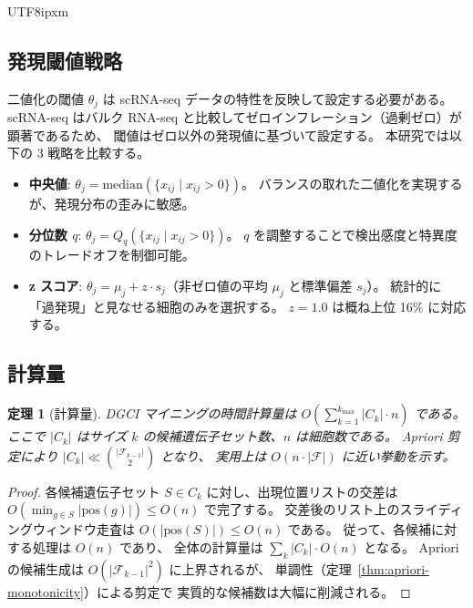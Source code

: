 \documentclass[11pt,a4paper]{article}
\newtheorem{theorem}{定理}
\begin{document}
\begin{CJK}{UTF8}{ipxm}
\subsection{発現閾値戦略}

二値化の閾値 $\theta_j$ は scRNA-seq データの特性を反映して設定する必要がある。
scRNA-seq はバルク RNA-seq と比較してゼロインフレーション（過剰ゼロ）が顕著であるため、
閾値はゼロ以外の発現値に基づいて設定する。
本研究では以下の 3 戦略を比較する。

\begin{itemize}
  \item \textbf{中央値}: $\theta_j = \mathrm{median}(\{x_{ij} \mid x_{ij} > 0\})$。
        バランスの取れた二値化を実現するが、発現分布の歪みに敏感。
  \item \textbf{分位数 $q$}: $\theta_j = Q_q(\{x_{ij} \mid x_{ij} > 0\})$。
        $q$ を調整することで検出感度と特異度のトレードオフを制御可能。
  \item \textbf{z スコア}: $\theta_j = \mu_j + z \cdot s_j$（非ゼロ値の平均 $\mu_j$ と標準偏差 $s_j$）。
        統計的に「過発現」と見なせる細胞のみを選択する。
        $z = 1.0$ は概ね上位 16\% に対応する。
\end{itemize}

\subsection{計算量}

\begin{theorem}[計算量]
\label{thm:complexity}
DGCI マイニングの時間計算量は $O\!\left(\sum_{k=1}^{k_{\max}} |C_k| \cdot n\right)$ である。
ここで $|C_k|$ はサイズ $k$ の候補遺伝子セット数、$n$ は細胞数である。
Apriori 剪定により $|C_k| \ll \binom{|\mathcal{F}_{k-1}|}{2}$ となり、
実用上は $O(n \cdot |\mathcal{F}|)$ に近い挙動を示す。
\end{theorem}

\begin{proof}
各候補遺伝子セット $S \in C_k$ に対し、出現位置リストの交差は
$O(\min_{g \in S} |\mathrm{pos}(g)|) \leq O(n)$ で完了する。
交差後のリスト上のスライディングウィンドウ走査は $O(|\mathrm{pos}(S)|) \leq O(n)$ である。
従って、各候補に対する処理は $O(n)$ であり、
全体の計算量は $\sum_{k} |C_k| \cdot O(n)$ となる。
Apriori の候補生成は $O(|\mathcal{F}_{k-1}|^2)$ に上界されるが、
単調性（定理~\ref{thm:apriori-monotonicity}）による剪定で
実質的な候補数は大幅に削減される。
\end{proof}


\end{CJK}
\end{document}

